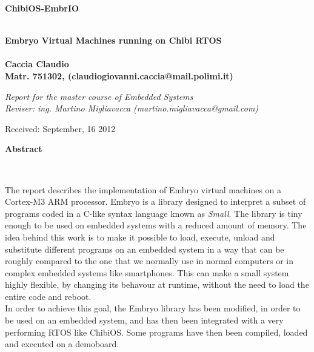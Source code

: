 \documentclass[a4paper,10pt]{article}
\newenvironment*{mytitle}{\begin{LARGE}\bf}{\end{LARGE}\\}%
\newenvironment*{mysubtitle}{\bf}{\\[1.5ex]}%
\newenvironment*{myabstract}{\begin{Large}\bf}{\end{Large}\\[2.5ex]}%
\begin{document}
\begin{mytitle}ChibiOS-EmbrIO\end{mytitle}
\begin{mysubtitle}Embryo Virtual Machines running on Chibi RTOS\end{mysubtitle}
%
%
\\
Caccia Claudio\\
Matr. 751302, (claudiogiovanni.caccia@mail.polimi.it)\\
\hspace{10ex}
\begin{flushright}
\emph{Report for the master course of Embedded Systems}\\
\emph{Reviser: ing. Martino Migliavacca (martino.migliavacca@gmail.com)}
\end{flushright}

Received: September, 16 2012\\
\hspace{10ex}

\begin{myabstract} Abstract \end{myabstract}

The report describes the implementation of Embryo virtual machines on a Cortex-M3 ARM processor. Embryo is a library designed to interpret a subset of programs coded in a C-like syntax language known as \textit{Small}. The library is tiny enough to be used on embedded systems with a reduced amount of memory. The idea behind this work is to make it possible to load, execute, unload and substitute different programs on an embedded system in a way that can be roughly compared to the one that we normally use in normal computers or in complex embedded systems like smartphones. This can make a small system highly flexible, by changing its behavour at runtime, without the need to load the entire code and reboot.\\
In order to achieve this goal, the Embryo library has been modified, in order to be used on an embedded system, and has then been integrated with a very performing RTOS like ChibiOS. Some programs have then been compiled, loaded and executed on a demoboard.
\end{document}
